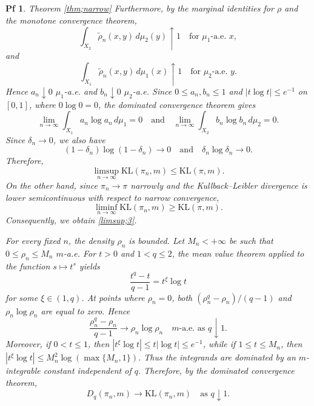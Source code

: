 \documentclass[10pt,a4paper]{amsart}
\newtheorem{pf}{Pf}
\newcommand{\dl}{\delta}
\begin{document}
\begin{pf}{Theorem \ref{thm;narrow}}
Furthermore, by the marginal identities for $\rho$ and the monotone convergence theorem,
\begin{equation*}
\int_{X_2}\tilde{\rho}_n(x,y)\,d\mu_2(y)\uparrow1
\quad\text{for $\mu_1$-a.e. }x,
\end{equation*}
and
\begin{equation*}
\int_{X_1}\tilde{\rho}_n(x,y)\,d\mu_1(x)\uparrow1
\quad\text{for $\mu_2$-a.e. }y.
\end{equation*}
Hence $a_n\downarrow0$ $\mu_1$-a.e. and $b_n\downarrow0$ $\mu_2$-a.e. Since $0\leq a_n,b_n\leq1$ and $|t\log t|\leq e^{-1}$ on $[0,1]$, where $0\log0=0$, the dominated convergence theorem gives
\begin{equation*}
\lim_{n\to\infty}\int_{X_1}a_n\log a_n\,d\mu_1=0 \quad\mathrm{and}\quad
\lim_{n\to\infty}\int_{X_2}b_n\log b_n\,d\mu_2=0.
\end{equation*}
Since $\dl_n\to0$, we also have
\begin{equation*}
(1-\dl_n)\log(1-\dl_n)\to0 \quad\mathrm{and}\quad \dl_n\log\dl_n\to0.
\end{equation*}
Therefore,
\begin{equation*}
\limsup_{n\to\infty}\mathrm{KL}(\pi_n,m)\leq\mathrm{KL}(\pi,m).
\end{equation*}
On the other hand, since $\pi_n\to\pi$ narrowly and the Kullback--Leibler divergence is lower semicontinuous with respect to narrow convergence,
\begin{equation*}
\liminf_{n\to\infty}\mathrm{KL}(\pi_n,m)\geq\mathrm{KL}(\pi,m).
\end{equation*}
Consequently, we obtain \eqref{limsup;3}.

For every fixed $n$, the density $\rho_n$ is bounded. Let $M_n<+\infty$ be such that $0\leq\rho_n\leq M_n$ $m$-a.e. For $t>0$ and $1<q\leq2$, the mean value theorem applied to the function $s\mapsto t^s$ yields
\begin{equation*}
\frac{t^q-t}{q-1}=t^\xi\log t
\end{equation*}
for some $\xi\in(1,q)$. At points where $\rho_n=0$, both $(\rho_n^q-\rho_n)/(q-1)$ and $\rho_n\log\rho_n$ are equal to zero. Hence
\begin{equation*}
\frac{\rho_n^q-\rho_n}{q-1}\to\rho_n\log\rho_n \quad m\text{-a.e. as }q \downarrow 1.
\end{equation*}
Moreover, if $0<t\leq1$, then $|t^\xi\log t|\leq t|\log t|\leq e^{-1}$, while if $1\leq t\leq M_n$, then $|t^\xi\log t|\leq M_n^2\log(\max\{M_n,1\})$. Thus the integrands are dominated by an $m$-integrable constant independent of $q$. Therefore, by the dominated convergence theorem,
\begin{equation*}
D_q(\pi_n,m)\to\mathrm{KL}(\pi_n,m)
\quad\text{as }q\downarrow1.
\end{equation*}


\end{pf}
\end{document}
